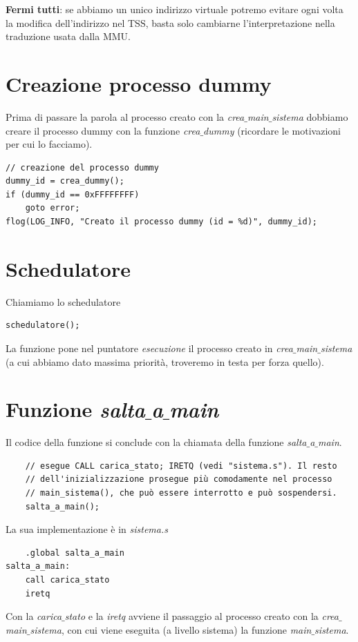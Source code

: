 \documentclass[11pt]{report}
\theoremstyle{definition}
\begin{document}
\begin{itemize}
\textbf{Fermi tutti}: se abbiamo un unico indirizzo virtuale potremo evitare ogni volta la modifica dell'indirizzo nel TSS, basta solo cambiarne l'interpretazione nella traduzione usata dalla MMU.

\end{itemize}

\section{Creazione processo dummy}
Prima di passare la parola al processo creato con la \emph {crea$\_$main$\_$sistema} dobbiamo creare il processo dummy con la funzione \emph{crea$\_$dummy} (ricordare le motivazioni per cui lo facciamo).
\small 
\begin{verbatim}
// creazione del processo dummy
dummy_id = crea_dummy();
if (dummy_id == 0xFFFFFFFF)
    goto error;
flog(LOG_INFO, "Creato il processo dummy (id = %d)", dummy_id);
\end{verbatim}
\normalsize 
\section{Schedulatore}
Chiamiamo lo schedulatore
\begin{verbatim}
schedulatore();
\end{verbatim}
La funzione pone nel puntatore \emph{esecuzione} il processo creato in \emph{crea$\_$main$\_$sistema} (a cui abbiamo dato massima priorità, troveremo in testa per forza quello).


\section{Funzione \emph{salta$\_$a$\_$main}}
Il codice della funzione si conclude con la chiamata della funzione \emph{salta$\_$a$\_$main}.
\small 
\begin{verbatim}
	// esegue CALL carica_stato; IRETQ (vedi "sistema.s"). Il resto
	// dell'inizializzazione prosegue più comodamente nel processo
	// main_sistema(), che può essere interrotto e può sospendersi.
	salta_a_main();
\end{verbatim}
\normalsize
La sua implementazione è in \emph{sistema.s}
\small
\begin{verbatim}
    .global salta_a_main
salta_a_main:
    call carica_stato
    iretq
\end{verbatim}
\normalsize
Con la \emph{carica$\_$stato} e la \emph{iretq} avviene il passaggio al processo creato con la \emph{crea$\_$main$\_$sistema}, con cui viene eseguita (a livello sistema) la funzione \emph{main$\_$sistema}.
\end{document}
